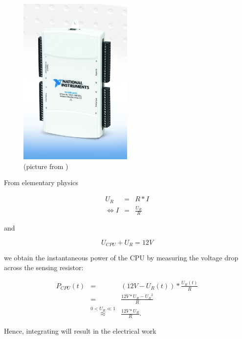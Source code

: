 \begin{figure}
  \centering
    \includegraphics[width=0.5\textwidth]{fig/NI-USB-6218.jpg}
  \caption{\JWPni{} (picture from )}
  \label{fig:ni}
\end{figure}


\label{sec:calc-work}

From elementary physics

\begin{eqnarray}
     U_R & = & R * I \\
  \iff I & = & \frac{U_R}{R}
\end{eqnarray}

and

\begin{equation}
  U_{CPU} + U_{R} = 12 V
\end{equation}

we obtain the instantaneous power of the CPU by measuring the voltage drop
across the sensing resistor:

\begin{eqnarray}
P_{CPU}(t) & = & (12V - U_R(t)) * \frac{U_R(t)}{R} \\
           & = & \frac{12V * U_R - {U_R}^2}{R} \\
           & \stackrel{0 < U_R \ll 1}{\approx} & \frac{12V * U_R}{R}.
\end{eqnarray}

Hence, integrating will result in the electrical work

